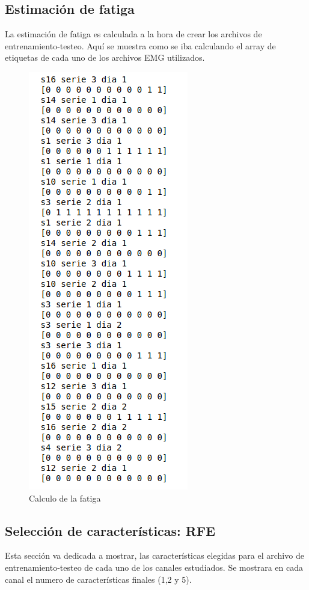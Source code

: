     \subsection{Estimación de fatiga}
    La estimación de fatiga es calculada a la hora de crear los archivos de entrenamiento-testeo. Aquí se muestra como se iba calculando el array de etiquetas de cada uno de los archivos EMG utilizados.
    \begin{figure}[ht]
            \centering
            \includegraphics[scale=0.3]{imagenes/estimacion fatiga.png}
            \caption{Calculo de la fatiga}
            \label{fig:calculo fatiga}
    \end{figure}
    
    \subsection{Selección de características: RFE}
    Esta sección va dedicada a mostrar, las características elegidas para el archivo de entrenamiento-testeo de cada uno de los canales estudiados. Se mostrara en cada canal el numero de características finales (1,2 y 5).
